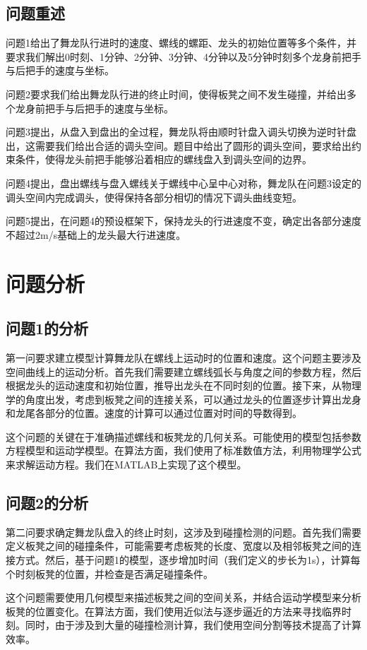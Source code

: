 \documentclass[withoutpreface,bwprint]{cumcmthesis1} %
\begin{document}
\subsection{问题重述}
问题1给出了舞龙队行进时的速度、螺线的螺距、龙头的初始位置等多个条件，并要求我们解出0时刻、1分钟、2分钟、3分钟、4分钟以及5分钟时刻多个龙身前把手与后把手的速度与坐标。\par
问题2要求我们给出舞龙队行进的终止时间，使得板凳之间不发生碰撞，并给出多个龙身前把手与后把手的速度与坐标。\par
问题3提出，从盘入到盘出的全过程，舞龙队将由顺时针盘入调头切换为逆时针盘出，这需要我们给出合适的调头空间。题目中给出了圆形的调头空间，要求给出约束条件，使得龙头前把手能够沿着相应的螺线盘入到调头空间的边界。\par
问题4提出，盘出螺线与盘入螺线关于螺线中心呈中心对称，舞龙队在问题3设定的调头空间内完成调头，使得保持各部分相切的情况下调头曲线变短。\par
问题5提出，在问题4的预设框架下，保持龙头的行进速度不变，确定出各部分速度不超过2m/s基础上的龙头最大行进速度。
\section{问题分析}
\subsection{问题1的分析}
第一问要求建立模型计算舞龙队在螺线上运动时的位置和速度。这个问题主要涉及空间曲线上的运动分析。首先我们需要建立螺线弧长与角度之间的参数方程，然后根据龙头的运动速度和初始位置，推导出龙头在不同时刻的位置。接下来，从物理学的角度出发，考虑到板凳之间的连接关系，可以通过龙头的位置逐步计算出龙身和龙尾各部分的位置。速度的计算可以通过位置对时间的导数得到。\par

\par
这个问题的关键在于准确描述螺线和板凳龙的几何关系。可能使用的模型包括参数方程模型和运动学模型。在算法方面，我们使用了标准数值方法，利用物理学公式来求解运动方程。我们在MATLAB上实现了这个模型。
\subsection{问题2的分析}
第二问要求确定舞龙队盘入的终止时刻，这涉及到碰撞检测的问题。首先我们需要定义板凳之间的碰撞条件，可能需要考虑板凳的长度、宽度以及相邻板凳之间的连接方式。然后，基于问题1的模型，逐步增加时间（我们定义的步长为1s），计算每个时刻板凳的位置，并检查是否满足碰撞条件。\par
这个问题需要使用几何模型来描述板凳之间的空间关系，并结合运动学模型来分析板凳的位置变化。在算法方面，我们使用近似法与逐步逼近的方法来寻找临界时刻。同时，由于涉及到大量的碰撞检测计算，我们使用空间分割等技术提高了计算效率。
\end{document}
